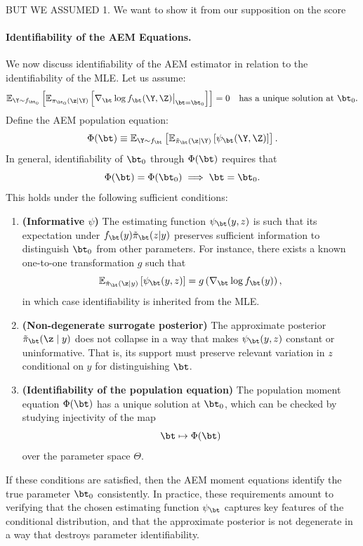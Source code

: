 {BUT WE ASSUMED 1. We want to show it from our supposition on the score

\paragraph{Identifiability of the AEM Equations.}
We now discuss identifiability of the AEM estimator in relation to the identifiability of the MLE. Let us assume:
%
\begin{equation}
\mathbb{E}_{\Y \sim f_{\bt_0}} \left[
\mathbb{E}_{\pi_{\bt_0}(\z \mid \Y)}
\left[
\nabla_\bt \log f_{\bt}(\Y, \Z) \big|_{\bt=\bt_0}
\right]
\right]
= 0
\quad \text{has a unique solution at } \bt_0.
\end{equation}
%
Define the AEM population equation:
%
\begin{equation}
\label{eqn:population-sme-identifiability}
\Phi(\bt)
\equiv
\mathbb{E}_{\Y \sim f_{\bt}} \left[
\mathbb{E}_{\tilde\pi_\bt(\z \mid \Y)}
\left[
\psi_\bt(\Y, \Z)
\right]
\right].
\end{equation}
%
In general, identifiability of $\bt_0$ through $\Phi(\bt)$ requires that
%
\[
\Phi(\bt) = \Phi(\bt_0)
\implies
\bt = \bt_0.
\]
%
This holds under the following sufficient conditions:
\begin{enumerate}
    \item \textbf{(Informative $\psi$)} The estimating function $\psi_\bt(y,z)$ is such that its expectation under $f_\bt(y)\tilde\pi_\bt(z|y)$ preserves sufficient information to distinguish $\bt_0$ from other parameters. For instance, there exists a known one-to-one transformation $g$ such that
    \[
    \mathbb{E}_{\tilde\pi_\bt(\z \mid y)}\left[\psi_\bt(y,z)\right]
    = g\left( \nabla_\bt \log f_\bt(y) \right),
    \]
    in which case identifiability is inherited from the MLE.
    \item \textbf{(Non-degenerate surrogate posterior)} The approximate posterior $\tilde\pi_\bt(\z \mid y)$ does not collapse in a way that makes $\psi_\bt(y,z)$ constant or uninformative. That is, its support must preserve relevant variation in $z$ conditional on $y$ for distinguishing $\bt$.
    \item \textbf{(Identifiability of the population equation)} The population moment equation $\Phi(\bt)$ has a unique solution at $\bt_0$, which can be checked by studying injectivity of the map
    \[
    \bt \mapsto \Phi(\bt)
    \]
    over the parameter space $\Theta$.
\end{enumerate}
%
If these conditions are satisfied, then the AEM moment equations identify the true parameter $\bt_0$ consistently. In practice, these requirements amount to verifying that the chosen estimating function $\psi_\bt$ captures key features of the conditional distribution, and that the approximate posterior is not degenerate in a way that destroys parameter identifiability.



}

